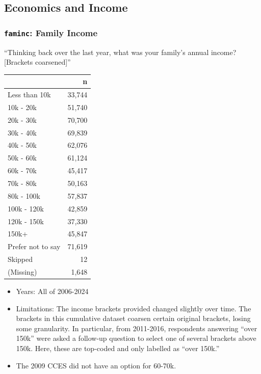 \documentclass[10pt,article,oneside]{memoir}
\begin{document}
\subsection{Economics and Income}\label{economics-and-income}

\subsubsection{\texorpdfstring{\texttt{faminc}: Family
Income}{faminc: Family Income}}\label{faminc-family-income}

``Thinking back over the last year, what was your family's annual
income? {[}Brackets coarsened{]}''

\begin{table}[H]
\centering
\begin{tabular}[t]{lr}
\toprule
 & n\\
\midrule
Less than 10k & 33,744\\
10k - 20k & 51,740\\
20k - 30k & 70,700\\
30k - 40k & 69,839\\
40k - 50k & 62,076\\
50k - 60k & 61,124\\
60k - 70k & 45,417\\
70k - 80k & 50,163\\
80k - 100k & 57,837\\
100k - 120k & 42,859\\
120k - 150k & 37,330\\
150k+ & 45,847\\
Prefer not to say & 71,619\\
Skipped & 12\\
(Missing) & 1,648\\
\bottomrule
\end{tabular}
\end{table}

\begin{itemize}
\tightlist
\item
  Years: All of 2006-2024
\item
  Limitations: The income brackets provided changed slightly over time.
  The brackets in this cumulative dataset coarsen certain original
  brackets, losing some granularity. In particular, from 2011-2016,
  respondents answering ``over 150k'' were asked a follow-up question to
  select one of several brackets above 150k. Here, these are top-coded
  and only labelled as ``over 150k.''
\item
  The 2009 CCES did not have an option for 60-70k.
\end{itemize}
\end{document}
